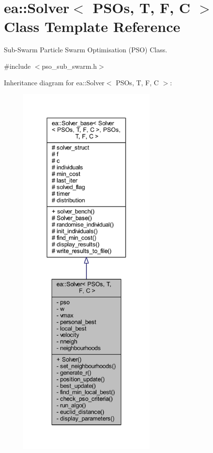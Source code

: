 \hypertarget{classea_1_1_solver_3_01_p_s_os_00_01_t_00_01_f_00_01_c_01_4}{}\section{ea\+:\+:Solver$<$ P\+S\+Os, T, F, C $>$ Class Template Reference}
\label{classea_1_1_solver_3_01_p_s_os_00_01_t_00_01_f_00_01_c_01_4}


Sub-\/\+Swarm Particle Swarm Optimisation (P\+SO) Class.  




{\ttfamily \#include $<$pso\+\_\+sub\+\_\+swarm.\+h$>$}



Inheritance diagram for ea\+:\+:Solver$<$ P\+S\+Os, T, F, C $>$\+:
\nopagebreak
\begin{figure}[H]
\begin{center}
\leavevmode
\includegraphics[height=550pt]{classea_1_1_solver_3_01_p_s_os_00_01_t_00_01_f_00_01_c_01_4__inherit__graph}
\end{center}
\end{figure}
